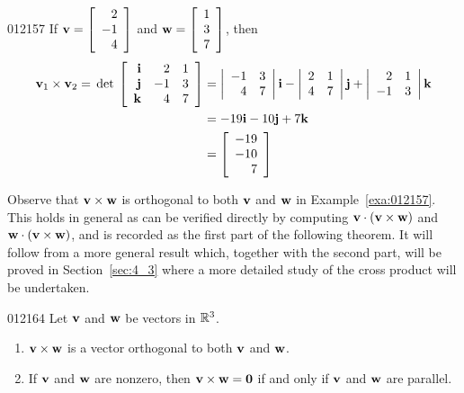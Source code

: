\begin{example}{}{012157}
If $\textbf{v} = \left[
\begin{array}{r}
2\\
-1\\
4
\end{array}
\right]$
and $\textbf{w} = \left[
\begin{array}{r}
1\\
3\\
7
\end{array}
\right]$, then
\begin{align*}
\textbf{v}_{1} \times \textbf{v}_{2} = \thinspace\operatorname{det\medspace}\left[
\begin{array}{rrr}
\textbf{i} & 2 & 1\\
\textbf{j} & -1 & 3\\
\textbf{k} & 4 & 7
\end{array}
\right]
&=
\left|
\begin{array}{rr}
-1 & 3\\
4 & 7
\end{array}
\right|\textbf{i}
-
\left|
\begin{array}{rr}
2 & 1\\
4 & 7
\end{array}
\right|\textbf{j}
+
\left|
\begin{array}{rr}
2 & 1\\
-1 & 3
\end{array}
\right|\textbf{k}\\
&= -19\textbf{i} - 10\textbf{j} + 7\textbf{k}\\
&= \left[
\begin{array}{r}
-19\\
-10\\
7
\end{array}
\right]
\end{align*}
\end{example}

Observe that $\textbf{v} \times \textbf{w}$ is orthogonal to both $\textbf{v}$ and $\textbf{w}$ in Example~\ref{exa:012157}. This holds in general as can be verified directly by computing $\textbf{v} \cdot (\textbf{v} \times \textbf{w})$ and $\textbf{w} \cdot (\textbf{v} \times \textbf{w})$, and is recorded as the first part of the following theorem. It will follow from a more general result which, together with the second part, will be proved in Section~\ref{sec:4_3} where a more detailed study of the cross product will be undertaken.

\begin{theorem}{}{012164}
Let $\textbf{v}$ and $\textbf{w}$ be vectors in $\mathbb{R}^3$.


\begin{enumerate}
\item $\textbf{v} \times \textbf{w}$ is a vector orthogonal to both $\textbf{v}$ and $\textbf{w}$.

\item If $\textbf{v}$ and $\textbf{w}$ are nonzero, then $\textbf{v} \times \textbf{w} = \textbf{0}$ if and only if $\textbf{v}$ and $\textbf{w}$ are parallel.

\end{enumerate}
\end{theorem}

